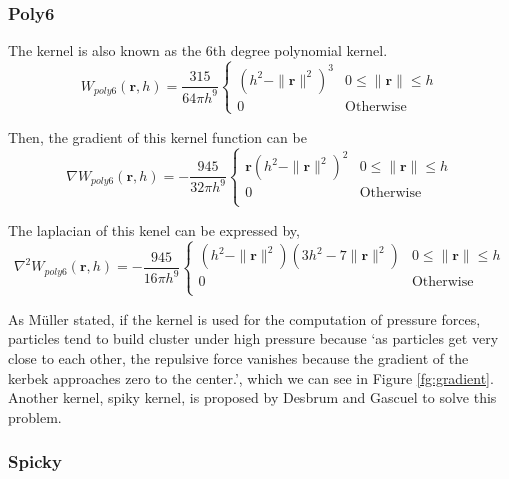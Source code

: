     \subsubsection{Poly6}
    The kernel is also known as the 6th degree polynomial kernel.
    \begin{equation}
        W_{poly 6}(\textbf{r}, h) = \frac{315}{64\pi h^{9}}
            \begin{cases}
                (h^2 - \|\textbf{r}\|^2)^3 & 0 \le \|\textbf{r}\| \le h \\
                0 & \textrm{Otherwise}
            \end{cases}
    \end{equation}

    Then, the gradient of this kernel function can be
    \begin{equation}
        \nabla W_{poly 6}(\textbf{r}, h) = - \frac{945}{32\pi h^9}
            \begin{cases}
                \textbf{r}(h^2 - \|\textbf{r}\|^2)^2 & 0\le\|\textbf{r}\|\le h \\
                0 & \textrm{Otherwise}\\
            \end{cases}
    \end{equation}

    The laplacian of this kenel can be expressed by, 
    \begin{equation}
        \nabla^2 W_{poly6}(\textbf{r}, h) = - \frac{945}{16\pi h^9}
            \begin{cases}
                (h^2 - \|\textbf{r}\|^2)(3h^2-7\|\textbf{r}\|^2) & 0\le\|\textbf{r}\|\le h \\
                0 & \textrm{Otherwise}\\
            \end{cases}
    \end{equation}

    As M\"uller stated\cite{muller2003particle}, if the kernel is used for the computation of pressure forces, particles tend to build cluster under high pressure because `as particles get very close to each other, the repulsive force vanishes because the gradient of the kerbek approaches zero to the center.', which we can see in Figure \ref{fg:gradient}. Another kernel, spiky kernel, is proposed by Desbrum and Gascuel\cite{desbrun1996smoothed} to solve this problem.

    \subsubsection{Spicky}

